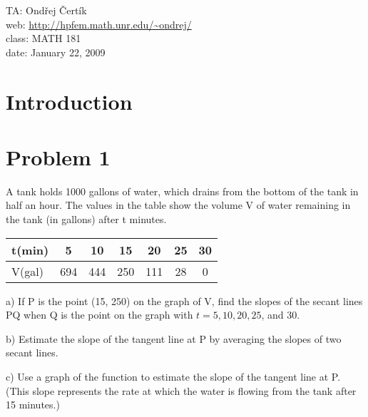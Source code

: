\documentclass[10pt]{article}
\begin{document}
\noindent TA: Ondřej Čertík\\
web: \url{http://hpfem.math.unr.edu/~ondrej/}\\
class: MATH 181\\
date: January 22, 2009

\section{Introduction}

\section{Problem 1}

A tank holds 1000 gallons of water, which drains from the bottom of the tank in
half an hour. The values in the table show the volume V of water remaining in
the tank (in gallons) after t minutes.

\begin{tabular}{|l||c|c|c|c|c|c|}
\hline
t(min) & 5   & 10  & 15  & 20  & 25 & 30 \\ \hline
V(gal) & 694 & 444 & 250 & 111 & 28 & 0 \\
\hline
\end{tabular}

a) If P is the point (15, 250) on the graph of V, find the
slopes of the secant lines PQ when Q is the point on the
graph with $t = 5, 10, 20, 25$, and 30.

b) Estimate the slope of the tangent line at P by averaging
the slopes of two secant lines.

c) Use a graph of the function to estimate the slope of the tangent line at P.
(This slope represents the rate at which the water is flowing from the tank
after 15 minutes.)
\end{document}
